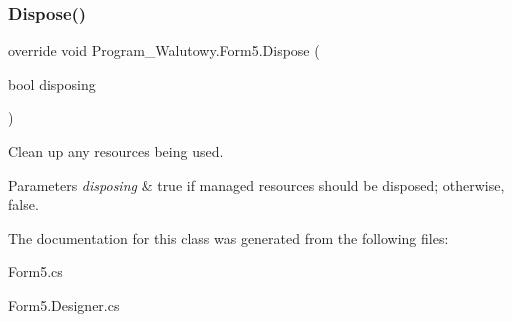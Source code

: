 \subsubsection{\texorpdfstring{Dispose()}{Dispose()}}
{\footnotesize\ttfamily override void Program\+\_\+\+Walutowy.\+Form5.\+Dispose (\begin{DoxyParamCaption}\item[{bool}]{disposing }\end{DoxyParamCaption})\hspace{0.3cm}{\ttfamily [protected]}}



Clean up any resources being used. 


\begin{DoxyParams}{Parameters}
{\em disposing} & true if managed resources should be disposed; otherwise, false.\\
\hline
\end{DoxyParams}


The documentation for this class was generated from the following files\+:\begin{DoxyCompactItemize}
\item 
Form5.\+cs\item 
Form5.\+Designer.\+cs\end{DoxyCompactItemize}
